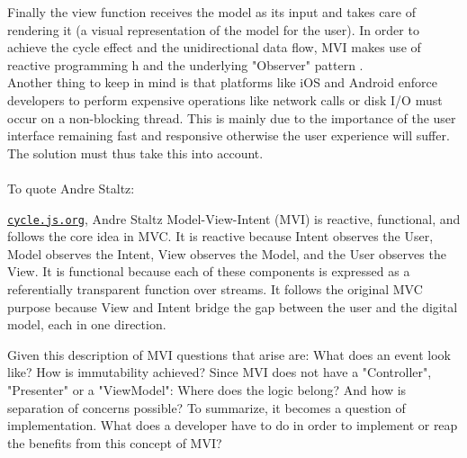 Finally the view function receives the model as its input and takes care of rendering it (a visual representation of the model for the user). 
In order to achieve the cycle effect and the unidirectional data flow, MVI makes use of reactive programming 
h\cite{reactiveProgrammingIntroAndreStaltz} and the underlying "Observer" pattern \cite{wikipediaObserverPattern}.\\

Another thing to keep in mind is that platforms like iOS and Android enforce developers to perform expensive operations like network calls or disk I/O must occur on a 
non-blocking thread. This is mainly due to the importance of the user interface remaining fast and responsive otherwise the user experience will suffer. 
The solution must thus take this into account.\\

\\
To quote Andre Staltz:
\begin{pquotation}{\href{https://cycle.js.org/model-view-intent.html#model-view-intent-what-mvc-is-really-about}{\nolinkurl{cycle.js.org}}, Andre Staltz}
    Model-View-Intent (MVI) is reactive, functional, and follows the core idea in MVC. It is reactive because Intent observes the User, Model observes the Intent, 
    View observes the Model, and the User observes the View. It is functional because each of these components is expressed as a referentially transparent function 
    over streams. It follows the original MVC purpose because View and Intent bridge the gap between the user and the digital model, each in one direction.
\end{pquotation}
Given this description of MVI questions that arise are: What does an event look like? How is immutability achieved?
Since MVI does not have a "Controller", "Presenter" or a "ViewModel": Where does the logic belong? And how is separation of concerns possible?
To summarize, it becomes a question of implementation. What does a developer have to do in order to implement or reap the benefits from this concept of MVI?